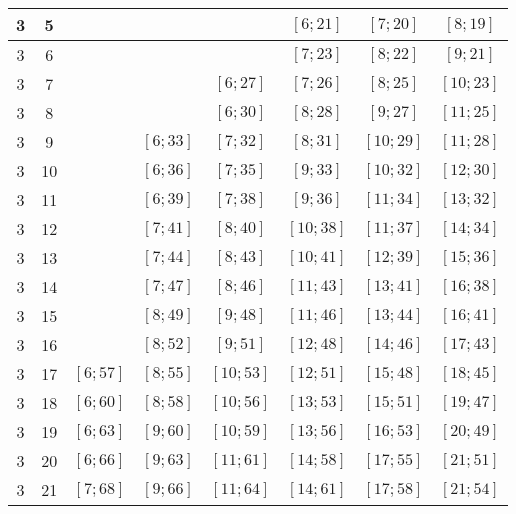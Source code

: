 \documentclass[a4paper,12pt]{article}
\begin{document}
\begin{center}
{\begin{longtable}[H]{|c|c|c|c|c|c|c|c|}
3 &  5 &   &   &   &  $\left[ 6; 21\right]$ &  $\left[ 7; 20\right]$ &  $\left[ 8; 19\right]$ \tabularnewline \hline
3 &  6 &   &   &   &  $\left[ 7; 23\right]$ &  $\left[ 8; 22\right]$ &  $\left[ 9; 21\right]$ \tabularnewline \hline
3 &  7 &   &   &  $\left[ 6; 27\right]$ &  $\left[ 7; 26\right]$ &  $\left[ 8; 25\right]$ &  $\left[ 10; 23\right]$ \tabularnewline \hline
3 &  8 &   &   &  $\left[ 6; 30\right]$ &  $\left[ 8; 28\right]$ &  $\left[ 9; 27\right]$ &  $\left[ 11; 25\right]$ \tabularnewline \hline
3 &  9 &   &  $\left[ 6; 33\right]$ &  $\left[ 7; 32\right]$ &  $\left[ 8; 31\right]$ &  $\left[ 10; 29\right]$ &  $\left[ 11; 28\right]$ \tabularnewline \hline
3 &  10 &   &  $\left[ 6; 36\right]$ &  $\left[ 7; 35\right]$ &  $\left[ 9; 33\right]$ &  $\left[ 10; 32\right]$ &  $\left[ 12; 30\right]$ \tabularnewline \hline
3 &  11 &   &  $\left[ 6; 39\right]$ &  $\left[ 7; 38\right]$ &  $\left[ 9; 36\right]$ &  $\left[ 11; 34\right]$ &  $\left[ 13; 32\right]$ \tabularnewline \hline
3 &  12 &   &  $\left[ 7; 41\right]$ &  $\left[ 8; 40\right]$ &  $\left[ 10; 38\right]$ &  $\left[ 11; 37\right]$ &  $\left[ 14; 34\right]$ \tabularnewline \hline
3 &  13 &   &  $\left[ 7; 44\right]$ &  $\left[ 8; 43\right]$ &  $\left[ 10; 41\right]$ &  $\left[ 12; 39\right]$ &  $\left[ 15; 36\right]$ \tabularnewline \hline
3 &  14 &   &  $\left[ 7; 47\right]$ &  $\left[ 8; 46\right]$ &  $\left[ 11; 43\right]$ &  $\left[ 13; 41\right]$ &  $\left[ 16; 38\right]$ \tabularnewline \hline
3 &  15 &   &  $\left[ 8; 49\right]$ &  $\left[ 9; 48\right]$ &  $\left[ 11; 46\right]$ &  $\left[ 13; 44\right]$ &  $\left[ 16; 41\right]$ \tabularnewline \hline
3 &  16 &   &  $\left[ 8; 52\right]$ &  $\left[ 9; 51\right]$ &  $\left[ 12; 48\right]$ &  $\left[ 14; 46\right]$ &  $\left[ 17; 43\right]$ \tabularnewline \hline
3 &  17 &  $\left[ 6; 57\right]$ &  $\left[ 8; 55\right]$ &  $\left[ 10; 53\right]$ &  $\left[ 12; 51\right]$ &  $\left[ 15; 48\right]$ &  $\left[ 18; 45\right]$ \tabularnewline \hline
3 &  18 &  $\left[ 6; 60\right]$ &  $\left[ 8; 58\right]$ &  $\left[ 10; 56\right]$ &  $\left[ 13; 53\right]$ &  $\left[ 15; 51\right]$ &  $\left[ 19; 47\right]$ \tabularnewline \hline
3 &  19 &  $\left[ 6; 63\right]$ &  $\left[ 9; 60\right]$ &  $\left[ 10; 59\right]$ &  $\left[ 13; 56\right]$ &  $\left[ 16; 53\right]$ &  $\left[ 20; 49\right]$ \tabularnewline \hline
3 &  20 &  $\left[ 6; 66\right]$ &  $\left[ 9; 63\right]$ &  $\left[ 11; 61\right]$ &  $\left[ 14; 58\right]$ &  $\left[ 17; 55\right]$ &  $\left[ 21; 51\right]$ \tabularnewline \hline
3 &  21 &  $\left[ 7; 68\right]$ &  $\left[ 9; 66\right]$ &  $\left[ 11; 64\right]$ &  $\left[ 14; 61\right]$ &  $\left[ 17; 58\right]$ &  $\left[ 21; 54\right]$ \tabularnewline \hline

\end{longtable}}
\end{center}
\end{document}
